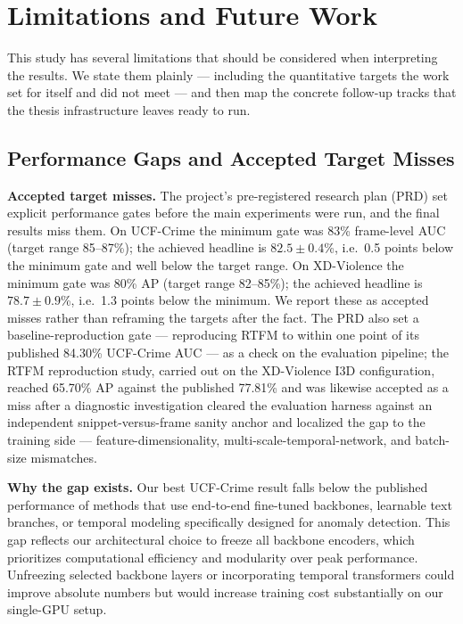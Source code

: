 \chapter{Limitations and Future Work}
\label{ch:08}

This study has several limitations that should be considered when interpreting
the results. We state them plainly --- including the quantitative targets the
work set for itself and did not meet --- and then map the concrete follow-up
tracks that the thesis infrastructure leaves ready to run.

\section{Performance Gaps and Accepted Target Misses}
\label{sec:lim-gaps}

\textbf{Accepted target misses.} The project's pre-registered research plan
(PRD) set explicit performance gates before the main experiments were run, and
the final results miss them. On UCF-Crime the minimum gate was 83\% frame-level
AUC (target range 85--87\%); the achieved headline is $82.5 \pm 0.4$\%, i.e.\
0.5 points below the minimum gate and well below the target range. On
XD-Violence the minimum gate was 80\% AP (target range 82--85\%); the achieved
headline is $78.7 \pm 0.9$\%, i.e.\ 1.3 points below the minimum. We report
these as accepted misses rather than reframing the targets after the fact. The
PRD also set a baseline-reproduction gate --- reproducing RTFM to within one
point of its published 84.30\% UCF-Crime AUC --- as a check on the evaluation
pipeline; the RTFM reproduction study, carried out on the XD-Violence I3D
configuration, reached 65.70\% AP against the published 77.81\% and was
likewise accepted as a miss after a diagnostic investigation cleared the
evaluation harness against an independent snippet-versus-frame sanity anchor
and localized the gap to the training side --- feature-dimensionality,
multi-scale-temporal-network, and batch-size mismatches.

\textbf{Why the gap exists.} Our best UCF-Crime result falls below the
published performance of methods that use end-to-end fine-tuned backbones,
learnable text branches, or temporal modeling specifically designed for
anomaly detection. This gap reflects our architectural choice to freeze all
backbone encoders, which prioritizes computational efficiency and modularity
over peak performance. Unfreezing selected backbone layers or incorporating
temporal transformers could improve absolute numbers but would increase
training cost substantially on our single-GPU setup.

